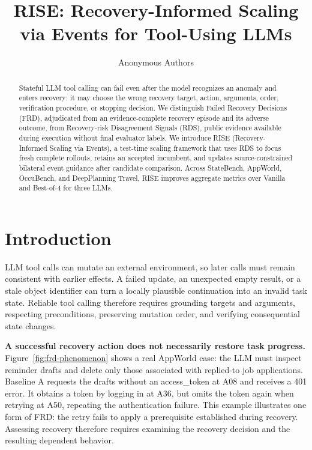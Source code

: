\documentclass{article}
\title{RISE: Recovery-Informed Scaling via Events for Tool-Using LLMs}
\author{Anonymous Authors}
\newcommand{\api}[1]{\textnormal{#1}}
\begin{document}
\maketitle

\begin{abstract}
Stateful LLM tool calling can fail even after the model recognizes an anomaly and enters recovery: it may choose the wrong recovery target, action, arguments, order, verification procedure, or stopping decision. We distinguish Failed Recovery Decisions (FRD), adjudicated from an evidence-complete recovery episode and its adverse outcome, from Recovery-risk Disagreement Signals (RDS), public evidence available during execution without final evaluator labels. We introduce RISE (Recovery-Informed Scaling via Events), a test-time scaling framework that uses RDS to focus fresh complete rollouts, retains an accepted incumbent, and updates source-constrained bilateral event guidance after candidate comparison. Across StateBench, AppWorld, OccuBench, and DeepPlanning Travel, RISE improves aggregate metrics over Vanilla and Best-of-4 for three LLMs.
\end{abstract}

\section{Introduction}

LLM tool calls can mutate an external environment, so later calls must remain consistent with earlier effects. A failed update, an unexpected empty result, or a stale object identifier can turn a locally plausible continuation into an invalid task state. Reliable tool calling therefore requires grounding targets and arguments, respecting preconditions, preserving mutation order, and verifying consequential state changes.

\textbf{A successful recovery action does not necessarily restore task progress.} Figure~\ref{fig:frd-phenomenon} shows a real AppWorld case: the LLM must inspect reminder drafts and delete only those associated with replied-to job applications. Baseline A requests the drafts without an \api{access\_token} at A08 and receives a 401 error. It obtains a token by logging in at A36, but omits the token again when retrying at A50, repeating the authentication failure. This example illustrates one form of FRD: the retry fails to apply a prerequisite established during recovery. Assessing recovery therefore requires examining the recovery decision and the resulting dependent behavior.
\end{document}
